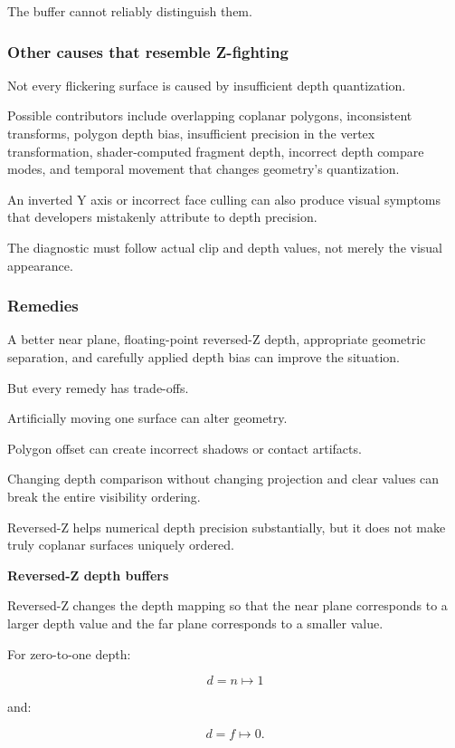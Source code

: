 The buffer cannot reliably distinguish them.

\subsubsection{Other causes that resemble Z-fighting}\label{other-causes-that-resemble-z-fighting}

Not every flickering surface is caused by insufficient depth quantization.

Possible contributors include overlapping coplanar polygons, inconsistent transforms, polygon depth bias, insufficient precision in the vertex transformation, shader-computed fragment depth, incorrect depth compare modes, and temporal movement that changes geometry's quantization.

An inverted Y axis or incorrect face culling can also produce visual symptoms that developers mistakenly attribute to depth precision.

The diagnostic must follow actual clip and depth values, not merely the visual appearance.

\subsubsection{Remedies}\label{remedies}

A better near plane, floating-point reversed-Z depth, appropriate geometric separation, and carefully applied depth bias can improve the situation.

But every remedy has trade-offs.

Artificially moving one surface can alter geometry.

Polygon offset can create incorrect shadows or contact artifacts.

Changing depth comparison without changing projection and clear values can break the entire visibility ordering.

Reversed-Z helps numerical depth precision substantially, but it does not make truly coplanar surfaces uniquely ordered.

\textbf{Reversed-Z depth buffers}

Reversed-Z changes the depth mapping so that the near plane corresponds to a larger depth value and the far plane corresponds to a smaller value.

For zero-to-one depth:

\[
 \boxed{ d=n\mapsto1 }
\]

and:

\[
 \boxed{ d=f\mapsto0 }.
\]


